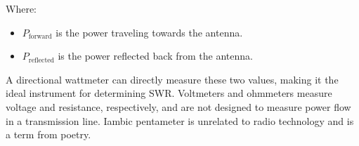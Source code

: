 Where:
\begin{itemize}
    \item \( P_{\text{forward}} \) is the power traveling towards the antenna.
    \item \( P_{\text{reflected}} \) is the power reflected back from the antenna.
\end{itemize}

A directional wattmeter can directly measure these two values, making it the ideal instrument for determining SWR. Voltmeters and ohmmeters measure voltage and resistance, respectively, and are not designed to measure power flow in a transmission line. Iambic pentameter is unrelated to radio technology and is a term from poetry.

